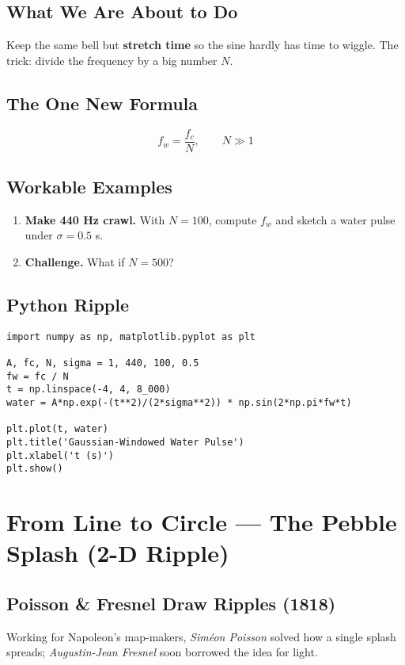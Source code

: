 \documentclass[12pt]{article}
\begin{document}
\subsection*{What We Are About to Do}
Keep the same bell but \textbf{stretch time} so the sine hardly has time to wiggle. The trick: divide the frequency by a big number \(N\).

\subsection*{The One New Formula}
\begin{equation}
  f_{w}=\frac{f_{c}}{N}, \qquad N\gg1
\end{equation}

\subsection*{Workable Examples}
\begin{enumerate}
  \item \textbf{Make 440 Hz crawl.}  With \(N=100\), compute \(f_{w}\) and sketch a water pulse under \(\sigma=0.5\) s.
  \item \textbf{Challenge.}  What if \(N=500\)?
\end{enumerate}

\subsection*{Python Ripple}
\begin{lstlisting}[caption=Slow ripple,label=lst:ripple]
import numpy as np, matplotlib.pyplot as plt

A, fc, N, sigma = 1, 440, 100, 0.5
fw = fc / N
t = np.linspace(-4, 4, 8_000)
water = A*np.exp(-(t**2)/(2*sigma**2)) * np.sin(2*np.pi*fw*t)

plt.plot(t, water)
plt.title('Gaussian-Windowed Water Pulse')
plt.xlabel('t (s)')
plt.show()
\end{lstlisting}

\section{From Line to Circle — The Pebble Splash (2-D Ripple)}
\subsection*{Poisson \& Fresnel Draw Ripples (1818)}
Working for Napoleon’s map-makers, \textit{Siméon Poisson} solved how a single splash spreads; \textit{Augustin-Jean Fresnel} soon borrowed the idea for light.
\end{document}
